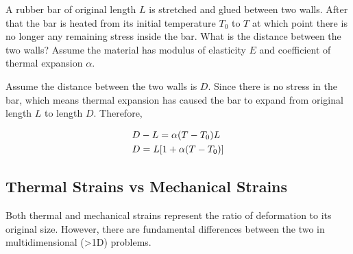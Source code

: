 \documentclass[
10pt,
a4paper,
openany,
svgnames,
]{book} %
\begin{document}
\begin{example}
  
  A rubber bar of original length $L$ is stretched and glued between two walls. After that the bar is heated from its initial temperature $T_0$ to $T$ at which point there is no longer any remaining stress inside the bar. What is the distance between the two walls? Assume the material has modulus of elasticity $E$ and coefficient of thermal expansion $\alpha$.
  
  \begin{figure}[H]
    \centering
  \end{figure}
  
\end{example}
\begin{solution}
  Assume the distance between the two walls is $D$. Since there is no stress in the bar, which means thermal expansion has caused the bar to expand from original length $L$ to length $D$. Therefore,
  
\[\begin{gathered}
  D - L = \alpha (T - {T_0})L \hfill \\
  D = L[1 + \alpha (T - {T_0})] \hfill \\ 
\end{gathered}\]
	
\end{solution}

\subsection{Thermal Strains vs Mechanical Strains}

Both thermal and mechanical strains represent the ratio of deformation to its original size. However, there are fundamental differences between the two in multidimensional (>1D) problems.
\end{document}
